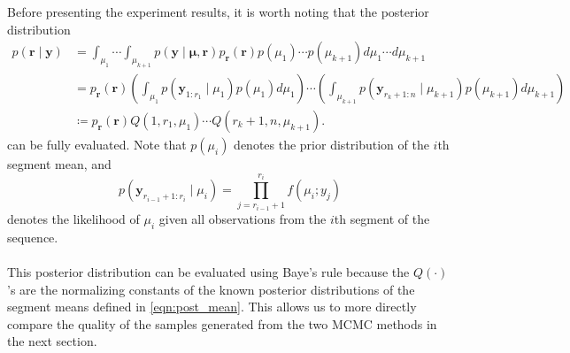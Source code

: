 Before presenting the experiment results, it is worth noting that the posterior distribution 
\begin{align*}
p(\bm{r} \mid \bm{y}) &= \int_{\mu_1}\cdots\int_{\mu_{k+1}} p(\bm{y} \mid \bm{\mu}, \bm{r}) p_{\bm{r}}(\bm{r}) p(\mu_1)\cdots p(\mu_{k+1}) d\mu_1\cdots d\mu_{k+1}\\
&= p_{\bm{r}}(\bm{r})\left(\int_{\mu_1}p(\bm{y}_{1 : r_1} \mid \mu_1) p(\mu_1) d\mu_1\right)\cdots\left(\int_{\mu_{k+1}}p(\bm{y}_{r_k+1 : n} \mid \mu_{k+1}) p(\mu_{k+1}) d\mu_{k+1}\right)\\
&\coloneqq p_{\bm{r}}(\bm{r})Q(1,r_1,\mu_1)\cdots Q(r_{k}+1,n,\mu_{k+1}).
\end{align*}
can be fully evaluated. Note that $p(\mu_i)$ denotes the prior distribution of the $i$th segment mean, and 
\[
p(\bm{y}_{r_{i-1}+1:r_i} \mid \mu_i) = \prod_{j=r_{i-1}+1}^{r_i} f(\mu_i ; y_j)
\]
denotes the likelihood of $\mu_i$ given all observations from the $i$th segment of the sequence.\\\\
This posterior distribution can be evaluated using Baye's rule because the $Q(\cdot)$'s are the normalizing constants of the known posterior distributions of the segment means defined in \cref{eqn:post_mean}. This allows us to more directly compare the quality of the samples generated from the two MCMC methods in the next section.
